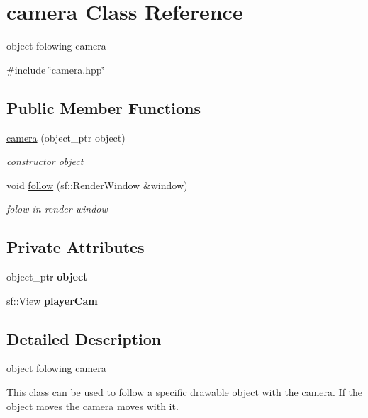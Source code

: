 \hypertarget{classcamera}{}\section{camera Class Reference}
\label{classcamera}


object folowing camera  




{\ttfamily \#include \char`\"{}camera.\+hpp\char`\"{}}

\subsection*{Public Member Functions}
\begin{DoxyCompactItemize}
\item 
\hyperlink{classcamera_ac3c67027b5f4f19c6f12db7d909930b5}{camera} (object\+\_\+ptr object)
\begin{DoxyCompactList}\small\item\em constructor object \end{DoxyCompactList}\item 
void \hyperlink{classcamera_a1bb99501ba67453e0ca86f3c8aef5cb1}{follow} (sf\+::\+Render\+Window \&window)
\begin{DoxyCompactList}\small\item\em folow in render window \end{DoxyCompactList}\end{DoxyCompactItemize}
\subsection*{Private Attributes}
\begin{DoxyCompactItemize}
\item 
\mbox{\label{classcamera_a2f634677bff4e01829c2b7023e302d5b}} 
object\+\_\+ptr {\bfseries object}
\item 
\mbox{\label{classcamera_a1ecd39044bc4cfde95854bb5c3390440}} 
sf\+::\+View {\bfseries player\+Cam}
\end{DoxyCompactItemize}


\subsection{Detailed Description}
object folowing camera 

This class can be used to follow a specific drawable object with the camera. If the object moves the camera moves with it. 

